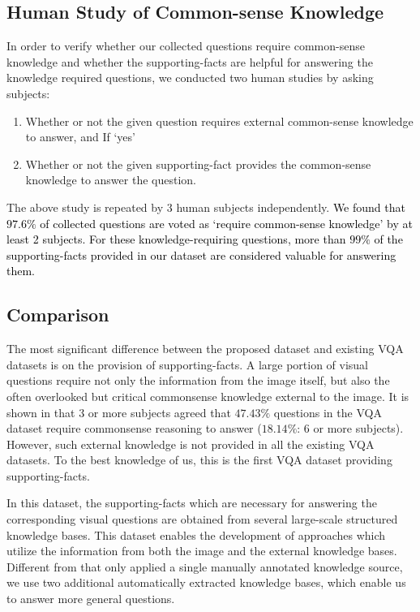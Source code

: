 \documentclass[10pt,journal]{IEEEtran}
\def\bluetext{}
\def\bluettt{\textcolor{black}}
\begin{document}
{\subsection{Human Study of Common-sense Knowledge}
In order to verify whether our collected questions require common-sense knowledge and whether the supporting-facts are helpful for answering the knowledge required questions, we conducted two human studies by asking subjects:
\begin{enumerate}
 \item Whether or not the given question requires external common-sense knowledge to answer, and If `yes'
 \item Whether or not the given supporting-fact provides the common-sense knowledge to answer the question.
\end{enumerate}
The above study is repeated by 3 human subjects independently.
\bluettt{
We found that $97.6\%$ of collected questions are voted as `require common-sense knowledge' by at least 2 subjects. For these knowledge-requiring questions, more than $99\%$ of the supporting-facts provided in our dataset 
are considered valuable for answering them.}







\subsection{Comparison}

The most significant difference between the proposed dataset and existing VQA datasets
is on the provision of supporting-facts.
A large portion of visual questions require not only the information from the image itself,
but also the often overlooked but critical commonsense knowledge external to the image.
\bluetext{It is shown in \cite{antol2015vqa} that 3 or more subjects agreed that
$47.43\%$ questions in the VQA dataset require commonsense reasoning to answer ($18.14\%$:  6 or more subjects).
However, such external knowledge is not provided in all the existing VQA datasets.
To the best knowledge of us, this is the first VQA dataset providing supporting-facts.}

In this dataset, the supporting-facts which are necessary for answering the corresponding visual questions
are obtained from several large-scale structured knowledge bases.
This dataset enables the development of approaches which utilize the information from both the image and the external knowledge bases. \bluetext{Different from \cite{wang2015explicit} that only applied a single manually annotated knowledge source, we use two additional automatically extracted knowledge bases, which enable us to answer more general questions.}

}
\end{document}
